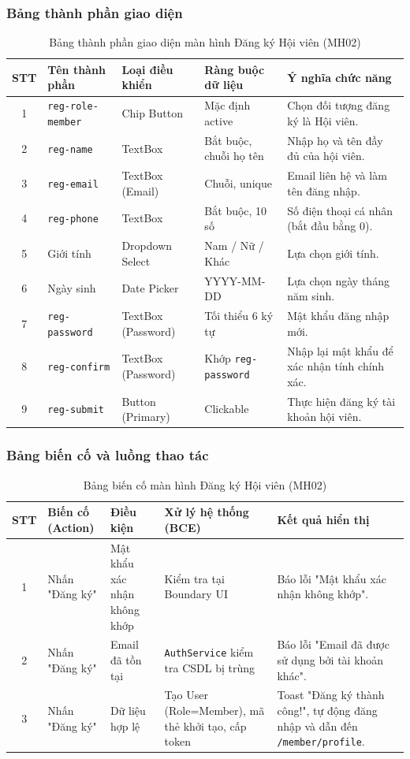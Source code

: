 \documentclass[12pt,a4paper]{report}
\begin{document}
\subsubsection{Bảng thành phần giao diện}
\begin{table}[H]
\centering
\small
\begin{tabularx}{\textwidth}{|c|l|l|l|X|}
\hline
\textbf{STT} & \textbf{Tên thành phần} & \textbf{Loại điều khiển} & \textbf{Ràng buộc dữ liệu} & \textbf{Ý nghĩa chức năng} \\ \hline
1 & \texttt{reg-role-member} & Chip Button & Mặc định active & Chọn đối tượng đăng ký là Hội viên. \\ \hline
2 & \texttt{reg-name} & TextBox & Bắt buộc, chuỗi họ tên & Nhập họ và tên đầy đủ của hội viên. \\ \hline
3 & \texttt{reg-email} & TextBox (Email) & Chuỗi, unique & Email liên hệ và làm tên đăng nhập. \\ \hline
4 & \texttt{reg-phone} & TextBox & Bắt buộc, 10 số & Số điện thoại cá nhân (bắt đầu bằng 0). \\ \hline
5 & Giới tính & Dropdown Select & Nam / Nữ / Khác & Lựa chọn giới tính. \\ \hline
6 & Ngày sinh & Date Picker & YYYY-MM-DD & Lựa chọn ngày tháng năm sinh. \\ \hline
7 & \texttt{reg-password} & TextBox (Password) & Tối thiểu 6 ký tự & Mật khẩu đăng nhập mới. \\ \hline
8 & \texttt{reg-confirm} & TextBox (Password) & Khớp \texttt{reg-password} & Nhập lại mật khẩu để xác nhận tính chính xác. \\ \hline
9 & \texttt{reg-submit} & Button (Primary) & Clickable & Thực hiện đăng ký tài khoản hội viên. \\ \hline
\end{tabularx}
\caption{Bảng thành phần giao diện màn hình Đăng ký Hội viên (MH02)}
\end{table}

\subsubsection{Bảng biến cố và luồng thao tác}
\begin{table}[H]
\centering
\small
\begin{tabularx}{\textwidth}{|c|l|l|X|X|}
\hline
\textbf{STT} & \textbf{Biến cố (Action)} & \textbf{Điều kiện} & \textbf{Xử lý hệ thống (BCE)} & \textbf{Kết quả hiển thị} \\ \hline
1 & Nhấn "Đăng ký" & Mật khẩu xác nhận không khớp & Kiểm tra tại Boundary UI & Báo lỗi "Mật khẩu xác nhận không khớp". \\ \hline
2 & Nhấn "Đăng ký" & Email đã tồn tại & \texttt{AuthService} kiểm tra CSDL bị trùng & Báo lỗi "Email đã được sử dụng bởi tài khoản khác". \\ \hline
3 & Nhấn "Đăng ký" & Dữ liệu hợp lệ & Tạo User (Role=Member), mã thẻ khởi tạo, cấp token & Toast "Đăng ký thành công!", tự động đăng nhập và dẫn đến \texttt{/member/profile}. \\ \hline
\end{tabularx}
\caption{Bảng biến cố màn hình Đăng ký Hội viên (MH02)}
\end{table}
\end{document}
